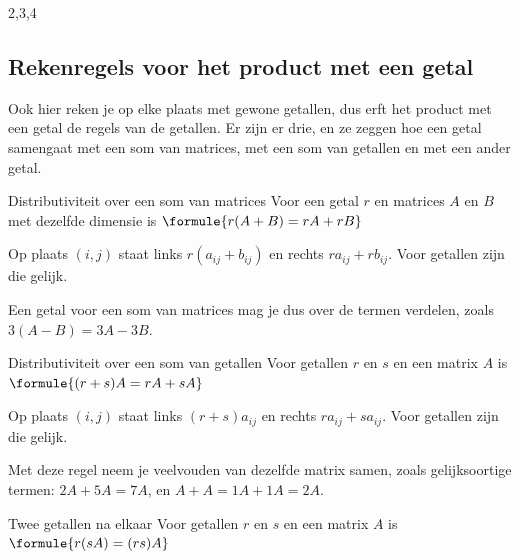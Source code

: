\begin{alleenvoor}{2,3,4}
\begin{oefeningen}
\end{oefeningen}

\subsection{Rekenregels voor het product met een getal}

Ook hier reken je op elke plaats met gewone getallen, dus erft het product met een getal de regels van de getallen. Er zijn er drie, en ze zeggen hoe een getal samengaat met een som van matrices, met een som van getallen en met een ander getal.

\begin{theorie}
\begin{stelling}{Distributiviteit over een som van matrices}
Voor een getal $r$ en matrices $A$ en $B$ met dezelfde dimensie is \qquad $\formule{r(A + B) = rA + rB}$
\end{stelling}

\begin{bewijs}
Op plaats $(i, j)$ staat links $r(a_{ij} + b_{ij})$ en rechts $ra_{ij} + rb_{ij}$. Voor getallen zijn die gelijk.
\end{bewijs}
\end{theorie}

Een getal voor een som van matrices mag je dus over de termen verdelen, zoals $3(A - B) = 3A - 3B$.

\begin{theorie}
\begin{stelling}{Distributiviteit over een som van getallen}
Voor getallen $r$ en $s$ en een matrix $A$ is \qquad $\formule{(r + s)A = rA + sA}$
\end{stelling}

\begin{bewijs}
Op plaats $(i, j)$ staat links $(r + s)a_{ij}$ en rechts $ra_{ij} + sa_{ij}$. Voor getallen zijn die gelijk.
\end{bewijs}
\end{theorie}

Met deze regel neem je veelvouden van dezelfde matrix samen, zoals gelijksoortige termen: $2A + 5A = 7A$, en $A + A = 1A + 1A = 2A$.

\begin{theorie}
\begin{stelling}{Twee getallen na elkaar}
Voor getallen $r$ en $s$ en een matrix $A$ is \qquad $\formule{r(sA) = (rs)A}$
\end{stelling}


\end{theorie}
\end{alleenvoor}
